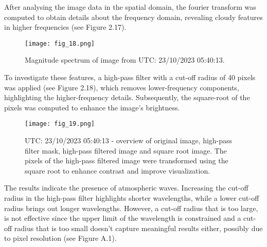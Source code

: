 After analysing the image data in the spatial domain, the fourier transform was computed to obtain details about the frequency domain, revealing cloudy features in higher frequencies (see Figure 2.17). 
\FloatBarrier
\begin{figure}[h!]
    \centering
    \texttt{[image: fig\_18.png]}
    \caption{Magnitude spectrum of image from UTC: 23/10/2023 05:40:13.}
\end{figure}
\FloatBarrier
To investigate these features, a high-pass filter with a cut-off radius of 40 pixels was applied (see Figure 2.18), which removes lower-frequency components, highlighting the higher-frequency details. Subsequently, the square-root of the pixels was computed to enhance the image's brightness.
\FloatBarrier
\begin{figure}[h!]
    \centering
    \texttt{[image: fig\_19.png]}
    \caption{UTC: 23/10/2023 05:40:13 - overview of original image, high-pass filter mask, high-pass filtered image and square root image. The pixels of the high-pass filtered image were transformed using the square root to enhance contrast and improve visualization.}
\end{figure}
\FloatBarrier
The results indicate the presence of atmospheric waves. Increasing the cut-off radius in the high-pass filter highlights shorter wavelengths, while a lower cut-off radius brings out longer wavelengths. However, a cut-off radius that is too large, is not effective since the upper limit of the wavelength is constrained and a cut-off radius that is too small doesn't capture meaningful results either, possibly due to pixel resolution (see Figure A.1).
